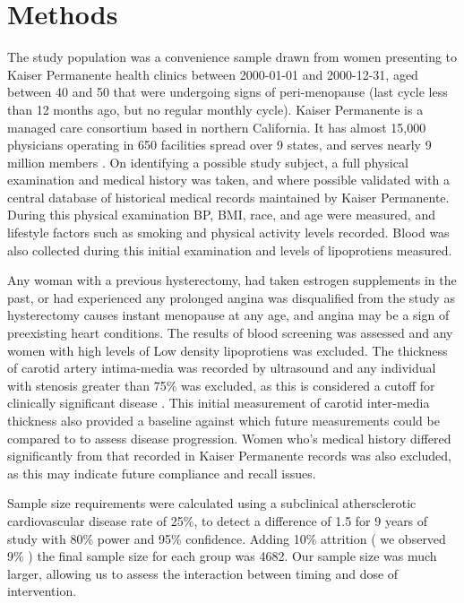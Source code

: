 \documentclass[11pt]{article}
\begin{document}
		\newpage
	\section{Methods} 
		The study population was a convenience sample drawn from women presenting to Kaiser Permanente health clinics between 2000-01-01 and 2000-12-31, aged between 40 and 50 that were undergoing signs of peri-menopause (last cycle less than 12 months ago, but no regular monthly cycle).
		Kaiser Permanente is a managed care consortium based in northern California. It has almost 15,000 physicians operating in 650 facilities spread over 9 states, and serves nearly 9 million members \cite{Rauber}.
		On identifying a possible study subject, a full physical examination and medical history was taken, and where possible validated with a central database of historical medical records maintained by Kaiser Permanente.
		During this physical examination BP, BMI, race, and age were measured, and lifestyle factors such as smoking and physical activity levels recorded.
		Blood was also collected during this initial examination and levels of lipoprotiens measured.


		Any woman with a previous hysterectomy, had taken estrogen supplements in the past, or had experienced any prolonged angina was disqualified from the study as hysterectomy causes instant menopause at any age, and angina may be a sign of preexisting heart conditions.
		The results of blood screening was assessed and any women with high levels of Low density lipoprotiens was excluded.
		The thickness of carotid artery intima-media was recorded  by ultrasound and any individual with stenosis greater than 75\% was excluded, as this is considered a cutoff for clinically significant disease \cite{Maseri2003}. 
		This initial measurement of carotid inter-media thickness also provided a baseline against which future measurements could be compared to to assess disease progression.
		Women who's medical history differed significantly from that recorded in Kaiser Permanente records was also excluded, as this may indicate future compliance and recall issues.
		

		Sample size requirements were calculated using a subclinical athersclerotic cardiovascular disease rate of 25\%, to detect a difference of 1.5 for 9 years of study with 80\% power and 95\% confidence.
		Adding 10\% attrition ( we observed 9\% ) the final sample size for each group was 4682. 
		Our sample size was much larger, allowing us to assess the interaction between timing and dose of intervention.
\end{document}
